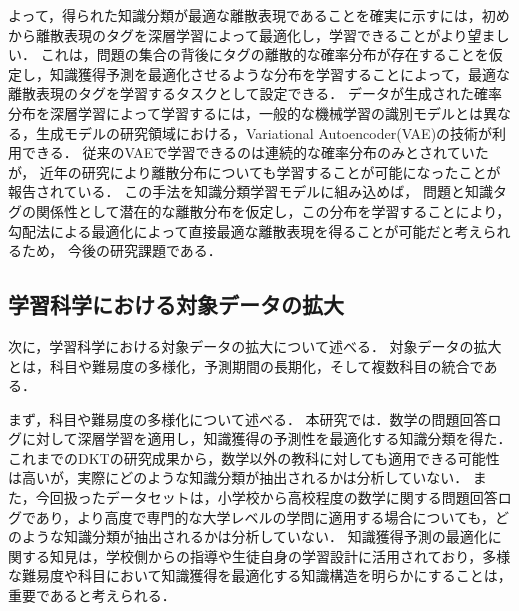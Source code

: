 よって，得られた知識分類が最適な離散表現であることを確実に示すには，初めから離散表現のタグを深層学習によって最適化し，学習できることがより望ましい．
これは，問題の集合の背後にタグの離散的な確率分布が存在することを仮定し，知識獲得予測を最適化させるような分布を学習することによって，最適な離散表現のタグを学習するタスクとして設定できる．
データが生成された確率分布を深層学習によって学習するには，一般的な機械学習の識別モデルとは異なる，生成モデルの研究領域における，Variational Autoencoder(VAE)の技術が利用できる\cite{kingma2014semi}．
従来のVAEで学習できるのは連続的な確率分布のみとされていたが，
近年の研究により離散分布についても学習することが可能になったことが報告されている\cite{maddison2016concrete, jang2016categorical}．
この手法を知識分類学習モデルに組み込めば，
問題と知識タグの関係性として潜在的な離散分布を仮定し，この分布を学習することにより，
勾配法による最適化によって直接最適な離散表現を得ることが可能だと考えられるため，
今後の研究課題である．




\subsection{学習科学における対象データの拡大}
次に，学習科学における対象データの拡大について述べる．
対象データの拡大とは，科目や難易度の多様化，予測期間の長期化，そして複数科目の統合である．


まず，科目や難易度の多様化について述べる．
本研究では．数学の問題回答ログに対して深層学習を適用し，知識獲得の予測性を最適化する知識分類を得た．
これまでのDKTの研究成果から，数学以外の教科に対しても適用できる可能性は高いが，実際にどのような知識分類が抽出されるかは分析していない．
また，今回扱ったデータセットは，小学校から高校程度の数学に関する問題回答ログであり，より高度で専門的な大学レベルの学問に適用する場合についても，どのような知識分類が抽出されるかは分析していない．
知識獲得予測の最適化に関する知見は，学校側からの指導や生徒自身の学習設計に活用されており，多様な難易度や科目において知識獲得を最適化する知識構造を明らかにすることは，重要であると考えられる．


